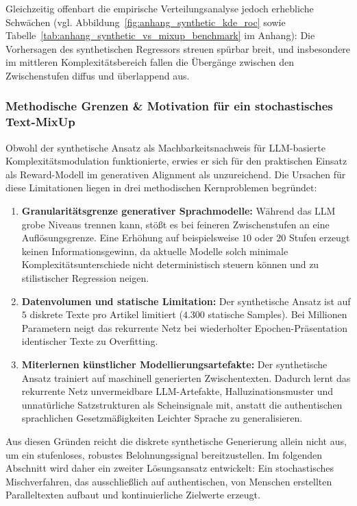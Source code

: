 Gleichzeitig offenbart die empirische Verteilungsanalyse jedoch erhebliche Schwächen (vgl. Abbildung~\ref{fig:anhang_synthetic_kde_roc} sowie Tabelle~\ref{tab:anhang_synthetic_vs_mixup_benchmark} im Anhang): Die Vorhersagen des synthetischen Regressors streuen spürbar breit, und insbesondere im mittleren Komplexitätsbereich fallen die Übergänge zwischen den Zwischenstufen diffus und überlappend aus.

\subsubsection{Methodische Grenzen \& Motivation für ein stochastisches Text-MixUp}
\label{sec:synthetische_grenzen_ausmusterung}

Obwohl der synthetische Ansatz als Machbarkeitsnachweis für LLM-basierte Komplexitätsmodulation funktionierte, erwies er sich für den praktischen Einsatz als Reward-Modell im generativen Alignment als unzureichend. Die Ursachen für diese Limitationen liegen in drei methodischen Kernproblemen begründet:
\begin{enumerate}
    \item \textbf{Granularitätsgrenze generativer Sprachmodelle:} Während das LLM grobe Niveaus trennen kann, stößt es bei feineren Zwischenstufen an eine Auflösungsgrenze. Eine Erhöhung auf beispielsweise $10$ oder $20$ Stufen erzeugt keinen Informationsgewinn, da aktuelle Modelle solch minimale Komplexitätsunterschiede nicht deterministisch steuern können und zu stilistischer Regression neigen.
    \item \textbf{Datenvolumen und statische Limitation:} Der synthetische Ansatz ist auf $5$ diskrete Texte pro Artikel limitiert ($4.300$ statische Samples). Bei Millionen Parametern neigt das rekurrente Netz bei wiederholter Epochen-Präsentation identischer Texte zu Overfitting.
    \item \textbf{Miterlernen künstlicher Modellierungsartefakte:} Der synthetische Ansatz trainiert auf maschinell generierten Zwischentexten. Dadurch lernt das rekurrente Netz unvermeidbare LLM-Artefakte, Halluzinationsmuster und unnatürliche Satzstrukturen als Scheinsignale mit, anstatt die authentischen sprachlichen Gesetzmäßigkeiten Leichter Sprache zu generalisieren.
\end{enumerate}

Aus diesen Gründen reicht die diskrete synthetische Generierung allein nicht aus, um ein stufenloses, robustes Belohnungssignal bereitzustellen. Im folgenden Abschnitt wird daher ein zweiter Lösungsansatz entwickelt: Ein stochastisches Mischverfahren, das ausschließlich auf authentischen, von Menschen erstellten Paralleltexten aufbaut und kontinuierliche Zielwerte erzeugt.


